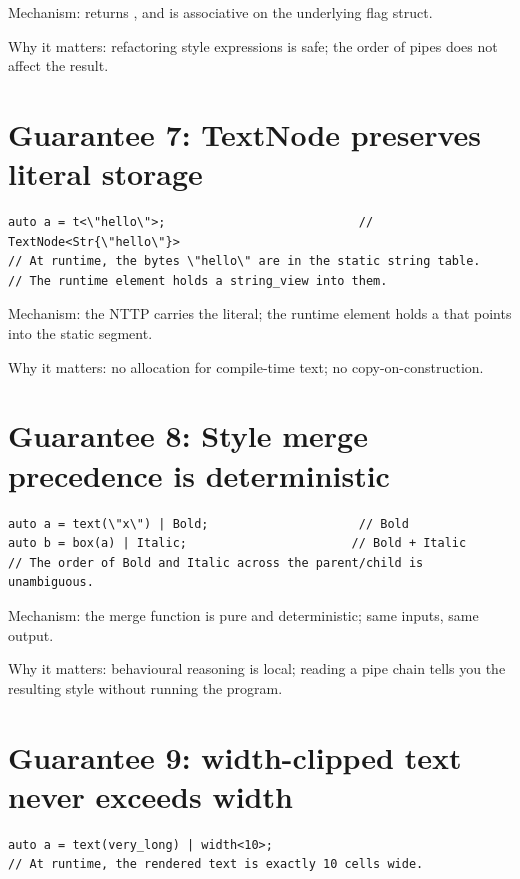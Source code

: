 Mechanism:  returns , and  is associative on the underlying flag
struct.

Why it matters: refactoring style expressions is safe; the
order of pipes does not affect the result.

\section{Guarantee 7: TextNode preserves literal storage}

\begin{lstlisting}
auto a = t<\"hello\">;                           // TextNode<Str{\"hello\"}>
// At runtime, the bytes \"hello\" are in the static string table.
// The runtime element holds a string_view into them.
\end{lstlisting}

Mechanism: the NTTP carries the literal; the runtime element
holds a  that points into the static segment.

Why it matters: no allocation for compile-time text; no
copy-on-construction.

\section{Guarantee 8: Style merge precedence is deterministic}

\begin{lstlisting}
auto a = text(\"x\") | Bold;                     // Bold
auto b = box(a) | Italic;                       // Bold + Italic
// The order of Bold and Italic across the parent/child is unambiguous.
\end{lstlisting}

Mechanism: the merge function is pure and deterministic; same
inputs, same output.

Why it matters: behavioural reasoning is local; reading a pipe
chain tells you the resulting style without running the program.

\section{Guarantee 9: width-clipped text never exceeds width}

\begin{lstlisting}
auto a = text(very_long) | width<10>;
// At runtime, the rendered text is exactly 10 cells wide.
\end{lstlisting}

